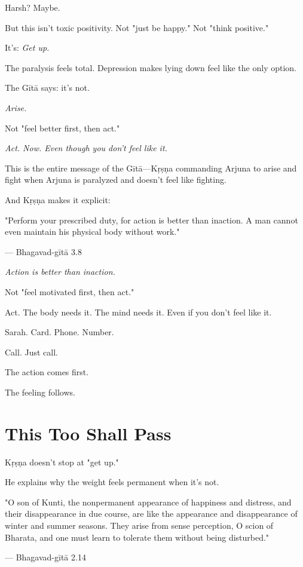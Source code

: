 \documentclass[11pt,twoside]{book}
\begin{document}
Harsh? Maybe.

But this isn't toxic positivity. Not "just be happy." Not "think positive."

It's: \textit{Get up.}

The paralysis feels total. Depression makes lying down feel like the only option.

The Gītā says: it's not.

\textit{Arise.}

Not "feel better first, then act."

\textit{Act. Now. Even though you don't feel like it.}

This is the entire message of the Gītā—Kṛṣṇa commanding Arjuna to arise and fight when Arjuna is paralyzed and doesn't feel like fighting.

And Kṛṣṇa makes it explicit:

\begin{pullquote}
"Perform your prescribed duty, for action is better than inaction. A man cannot even maintain his physical body without work."

--- Bhagavad-gītā 3.8
\end{pullquote}

\textit{Action is better than inaction.}

Not "feel motivated first, then act."

Act. The body needs it. The mind needs it. Even if you don't feel like it.

Sarah. Card. Phone. Number.

Call. Just call.

The action comes first.

The feeling follows.

\section*{This Too Shall Pass}

Kṛṣṇa doesn't stop at "get up."

He explains why the weight feels permanent when it's not.

\begin{pullquote}
"O son of Kunti, the nonpermanent appearance of happiness and distress, and their disappearance in due course, are like the appearance and disappearance of winter and summer seasons. They arise from sense perception, O scion of Bharata, and one must learn to tolerate them without being disturbed."

--- Bhagavad-gītā 2.14
\end{pullquote}
\end{document}
